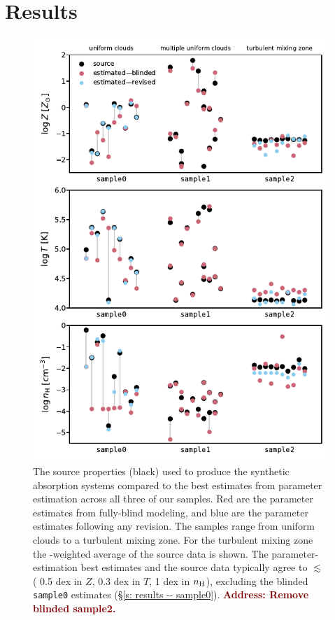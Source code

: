 \documentclass[fleqn,usenatbib]{mnras}
\newcommand{\todo}[1]{\textcolor{Maroon}{\textbf{Address: #1}}}
\begin{document}
\section{Results}
\label{s: results}

\begin{figure}
    \centering
    \includegraphics[width=\columnwidth]{figures/averages.pdf}
    \caption{
    The source properties (black) used to produce the synthetic absorption systems
    compared to the best estimates from parameter estimation across all three of our samples.
    Red are the parameter estimates from fully-blind modeling,
    and blue are the parameter estimates following any revision.
    The samples range from uniform clouds to a turbulent mixing zone.
    For the turbulent mixing zone the -weighted average of the source data is shown.
    The parameter-estimation best estimates and the source data typically agree to $\lesssim$ ( 0.5 dex in $Z$, 0.3 dex in $T$, 1 dex in $n_{\rm H}$),
    excluding the blinded \texttt{sample0} estimates (\S\ref{s: results -- sample0}).
    \todo{Remove blinded sample2.}
    }
    \label{f: summary--average}
\end{figure}
\end{document}

